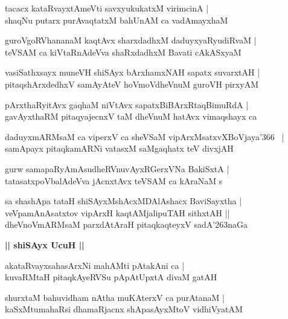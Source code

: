 \documentclass[twoside,12pt,openright]{book}
\def\S{\char'263}
\newcounter{shloka}[chapter]
\def\uvaca#1{\centerline{{\large\textbf{#1}}}}
\begin{document}
\begin{shloka}%
tacacx kataRvayxtAmeVti savxyukukatxM virimcinA |\\
shaqNu putarx purAvaqtatxM bahUnAM ca vadAmayxhaM 
\end{shloka}

\begin{shloka}%
guroVgoRVhananaM kaqtAvx sharxdadhxM daduyxyaRyudiRvaM |\\
teVSAM ca kiVtaRnAdeVva shaRxdadhxM Bavati cAkASxyaM 
\end{shloka}

\begin{shloka}%
vasiSathxsayx muneVH shiSAyx bArxhamxNAH sapatx suvarxtAH |\\
pitaqshArxdedhxV samAyAteV hoVmoVdheVnuM guroVH pirxyAM
\end{shloka}

\begin{shloka}%
pArxthaRyitAvx gaqhaM niVtAvx sapatxBiBArxRtaqBimuRdA |\\
gavAyxthaRM pitaqyajecnxV taM dheVnuM hatAvx vimaqshayx ca 
\end{shloka}

\begin{shloka}%
daduyxmARMsaM ca viperxV ca sheVSaM vipArxMsatxvXBoVjaya\char'366 ~|\\
samApayx pitaqkamARNi vatasxM saMgaqhatx teV divxjAH 
\end{shloka}

\begin{shloka}%
gurw samapaRyAmAsudheRVnuvAyxRGerxVNa BakiSxtA |\\
tatasatxpoVbalAdeVva jAcnxtAvx teVSAM ca kAraNaM s
\end{shloka}

\begin{shloka}%
sa shashApa tataH shiSAyxMshAcxMDAlAshacx BaviSayxtha |\\
veVpamAnAsatxtov vipArxH kaqtAMjalipuTAH sithxtAH ||\\
dheVnoVmARMsaM parxdAtAraH pitaqkaqteyxV sadA\S naGa
\end{shloka}

\uvaca{|| shiSAyx UcuH ||}

\begin{shloka}%
akataRvayxsahasArxNi mahAMti pAtakAni ca |\\
kuvaRMtaH pitaqkAyeRVSu pApAtUpxtA divaM gatAH 
\end{shloka}

\begin{shloka}%
shurxtaM bahuvidham nAtha muKAterxV ca purAtanaM |\\
kaSxMtumahaRsi dhamaRjacnx shApasAyxMtoV vidhiVyatAM 
\end{shloka}
\end{document}
